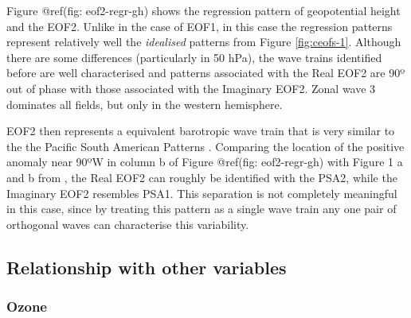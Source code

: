 \documentclass[smallextended]{svjour3}       %
\begin{document}
Figure @ref(fig: eof2-regr-gh) shows the regression pattern of geopotential height and the EOF2. Unlike in the case of EOF1, in this case the regression patterns represent relatively well the \emph{idealised} patterns from Figure \ref{fig:ceofs-1}. Although there are some differences (particularly in 50 hPa), the wave trains identified before are well characterised and patterns associated with the Real EOF2 are 90º out of phase with those associated with the Imaginary EOF2. Zonal wave 3 dominates all fields, but only in the western hemisphere.

EOF2 then represents a equivalent barotropic wave train that is very similar to the the Pacific South American Patterns \citep{mo2001}. Comparing the location of the positive anomaly near 90ºW in column b of Figure @ref(fig: eof2-regr-gh) with Figure 1 a and b from \citet{mo2001}, the Real EOF2 can roughly be identified with the PSA2, while the Imaginary EOF2 resembles PSA1. This separation is not completely meaningful in this case, since by treating this pattern as a single wave train any one pair of orthogonal waves can characterise this variability.

\hypertarget{relationship-with-other-variables}{%
\subsection{Relationship with other variables}\label{relationship-with-other-variables}}

\hypertarget{ozone}{%
\subsubsection{Ozone}\label{ozone}}
\end{document}
